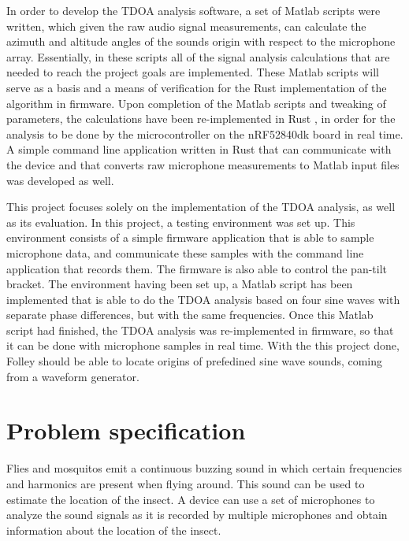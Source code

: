 \documentclass[a4paper]{article}
\begin{document}
In order to develop the TDOA analysis software, a set of Matlab \cite{matlab} scripts were written, which given the raw audio signal measurements, can calculate the azimuth and altitude angles of the sounds origin with respect to the microphone array. Essentially, in these scripts all of the signal analysis calculations that are needed to reach the project goals are implemented. These Matlab scripts will serve as a basis and a means of verification for the Rust implementation of the algorithm in firmware. Upon completion of the Matlab scripts and tweaking of parameters, the calculations have been re-implemented in Rust \cite{rust}, in order for the analysis to be done by the microcontroller on the nRF52840dk \cite{nrf52840-dk} board in real time. A simple command line application written in Rust that can communicate with the device and that converts raw microphone measurements to Matlab input files was developed as well.

This project focuses solely on the implementation of the TDOA analysis, as well as its evaluation. In this project, a testing environment was set up. This environment consists of a simple firmware application that is able to sample microphone data, and communicate these samples with the command line application that records them. The firmware is also able to control the pan-tilt bracket. The environment having been set up, a Matlab script has been implemented that is able to do the TDOA analysis based on four sine waves with separate phase differences, but with the same frequencies. Once this Matlab script had finished, the TDOA analysis was re-implemented in firmware, so that it can be done with microphone samples in real time. With the this project done, Folley should be able to locate origins of prefedined sine wave sounds, coming from a waveform generator.


\section{Problem specification}
Flies and mosquitos emit a continuous buzzing sound in which certain frequencies and harmonics are present when flying around. This sound can be used to estimate the location of the insect. A device can use a set of microphones to analyze the sound signals as it is recorded by multiple microphones and obtain information about the location of the insect.
\end{document}

